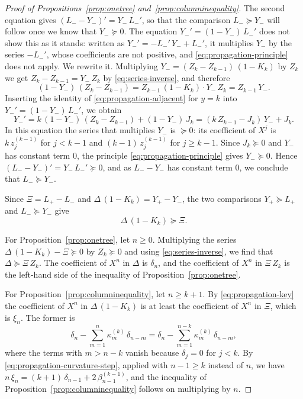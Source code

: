 \documentclass{amsart}
\theoremstyle{definition}
\theoremstyle{remark}
\numberwithin{equation}{section}
\begin{document}
\begin{proof}[Proof of Propositions~\ref{prop:onetree} and~\ref{prop:columninequality}]
The second equation gives $(L_--Y_-)'=Y_-\,L_-'$, so that the comparison
$L_-\succeq Y_-$ will follow once we know that $Y_-\succeq0$. The equation
$Y_-'=(1-Y_-)\,L_-'$ does not show this as it stands: written as
$Y_-'=-L_-'\,Y_-+L_-'$, it multiplies $Y_-$ by the series $-L_-'$, whose
coefficients are not positive, and \eqref{eq:propagation-principle} does not
apply. We rewrite it. Multiplying $Y_-=(Z_k-Z_{k-1})\,(1-K_k)$ by $Z_k$ we
get $Z_k-Z_{k-1}=Y_-\,Z_k$ by \eqref{eq:series-inverse}, and therefore
\[
(1-Y_-)\,(Z_k-Z_{k-1})=Z_{k-1}\,(1-K_k)\cdot Y_-\,Z_k=Z_{k-1}\,Y_- .
\]
Inserting the identity of \eqref{eq:propagation-adjacent} for $y=k$ into
$Y_-'=(1-Y_-)\,L_-'$, we obtain
\[
Y_-'=k\,(1-Y_-)\,(Z_k-Z_{k-1})+(1-Y_-)\,J_k=(k\,Z_{k-1}-J_k)\,Y_-+J_k .
\]
In this equation the series that multiplies $Y_-$ is $\succeq0$: its
coefficient of $X^j$ is $k\,z^{(k-1)}_j$ for $j<k-1$ and
$(k-1)\,z^{(k-1)}_j$ for $j\ge k-1$. Since $J_k\succeq0$ and $Y_-$ has
constant term $0$, the principle \eqref{eq:propagation-principle} gives
$Y_-\succeq0$. Hence $(L_--Y_-)'=Y_-\,L_-'\succeq0$, and as $L_--Y_-$ has
constant term $0$, we conclude that $L_-\succeq Y_-$.

Since $\Xi=L_+-L_-$ and $\Delta\,(1-K_k)=Y_+-Y_-$, the two comparisons
$Y_+\succeq L_+$ and $L_-\succeq Y_-$ give
\begin{equation}\label{eq:propagation-key}
\Delta\,(1-K_k)\succeq\Xi .
\end{equation}

For Proposition~\ref{prop:onetree}, let $n\ge0$. Multiplying the
series $\Delta\,(1-K_k)-\Xi\succeq0$ by $Z_k\succeq0$ and using
\eqref{eq:series-inverse}, we find that $\Delta\succeq\Xi\,Z_k$. The
coefficient of $X^n$ in $\Delta$ is $\delta_n$, and the coefficient of $X^n$
in $\Xi\,Z_k$ is the left-hand side of the inequality of
Proposition~\ref{prop:onetree}.

For Proposition~\ref{prop:columninequality}, let $n\ge k+1$. By
\eqref{eq:propagation-key} the
coefficient of $X^n$ in $\Delta\,(1-K_k)$ is at least the coefficient of
$X^n$ in $\Xi$, which is $\xi_n$. The former is
\[
\delta_n-\sum_{m=1}^{n}\kappa^{(k)}_m\,\delta_{n-m}
=\delta_n-\sum_{m=1}^{n-k}\kappa^{(k)}_m\,\delta_{n-m} ,
\]
where the terms with $m>n-k$ vanish because $\delta_j=0$ for $j<k$. By
\eqref{eq:propagation-curvature-step}, applied with $n-1\ge k$ instead of
$n$, we have $n\,\xi_n=(k+1)\,\delta_{n-1}+2\,\beta^{(k-1)}_{n-1}$, and the
inequality of Proposition~\ref{prop:columninequality} follows on multiplying
by $n$.
\end{proof}
\end{document}
